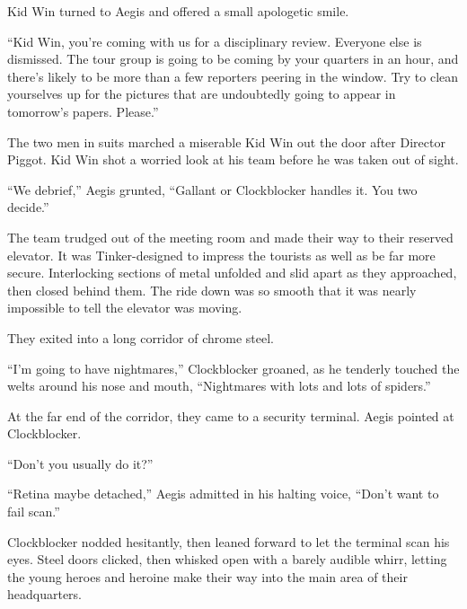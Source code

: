 Kid Win turned to Aegis and offered a small apologetic smile.



``Kid Win, you're coming with us for a disciplinary review.  Everyone else is dismissed.  The tour group is going to be coming by your quarters in an hour, and there's likely to be more than a few reporters peering in the window.  Try to clean yourselves up for the pictures that are undoubtedly going to appear in tomorrow's papers.  Please.''



The two men in suits marched a miserable Kid Win out the door after Director Piggot.  Kid Win shot a worried look at his team before he was taken out of sight.



``We debrief,'' Aegis grunted, ``Gallant or Clockblocker handles it.  You two decide.''



The team trudged out of the meeting room and made their way to their reserved elevator.  It was Tinker-designed to impress the tourists as well as be far more secure.  Interlocking sections of metal unfolded and slid apart as they approached, then closed behind them.  The ride down was so smooth that it was nearly impossible to tell the elevator was moving.



They exited into a long corridor of chrome steel.



``I'm going to have nightmares,'' Clockblocker groaned, as he tenderly touched the welts around his nose and mouth, ``Nightmares with lots and lots of spiders.''



At the far end of the corridor, they came to a security terminal.  Aegis pointed at Clockblocker.



``Don't you usually do it?''



``Retina maybe detached,'' Aegis admitted in his halting voice, ``Don't want to fail scan.''



Clockblocker nodded hesitantly, then leaned forward to let the terminal scan his eyes.  Steel doors clicked, then whisked open with a barely audible whirr, letting the young heroes and heroine make their way into the main area of their headquarters.



